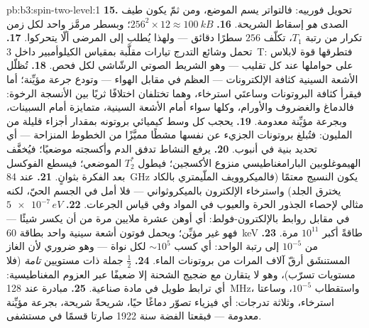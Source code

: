 \begin{solution}{pb:b3:spin-two-level:1}
\textbf{15.} تحويل فورييه: فالتواتر يسم الموضع، ومن ثمّ
يكون طيف الصدى \emph{هو} إسقاط الشريحة.
\textbf{16.} $256^2 \times 12 \approx \qty{100}{kB}$؛ وبسطر
مرمَّز واحد لكل زمن تكرار من رتبة $T_1$، تكلّف $256$ سطرًا
دقائق --- ولهذا يُطلب إلى المرضى ألّا يتحركوا.
\textbf{17.} تحمل وشائع التدرج تيارات مقلَّبة بمقياس الكيلوأمبير
داخل \qty{3}{T}: فتطرقها قوة لابلاس على حواملها عند كل
تقليب --- وهو الشريط الصوتي الرشّاشي لكل فحص.
\textbf{18.} تُظلّل الأشعة السينية كثافة الإلكترونات --- العظم في مقابل الهواء ---
وتودع جرعة مؤيِّنة؛ أما  فيقرأ كثافة البروتونات وساعتَي
استرخاء، وهما تختلفان اختلافًا ثريًا بين الأنسجة الرخوة: فالدماغ
والغضروف والأورام، وكلها سواء أمام الأشعة السينية، متمايزة أمام السبينات،
وبجرعة مؤيِّنة معدومة.
\textbf{19.} يحجب كل وسط كيميائي بروتونه بمقدار
أجزاء قليلة من المليون: فتُبلغ بروتونات الجزيء عن نفسها مشطًا مميَّزًا
من الخطوط المنزاحة --- أي تحديد بنية في أنبوب.
\textbf{20.} يرفع النشاط تدفق الدم وأكسجته موضعيًا؛ فيُخفَّف
الهيموغلوبين البارامغناطيسي منزوع الأكسجين؛ فيطول $T_2^*$ الموضعي؛
فيسطع الفوكسل بعد الفكرة بثوانٍ.
\textbf{21.} عند \qty{84}{GHz} يكون النسيج معتمًا (فالميكروويف
الملّيمتري بالكاد يخترق الجلد) واسترخاء الإلكترون
بالميكروثواني --- فلا أمل في الجسم الحيّ، لكنه مثالي لإحصاء
الجذور الحرة والعيوب في المواد وفي قياس الجرعات.
\textbf{22.} $\num{5e-7}\,\unit{eV}$ في مقابل روابط بالإلكترون-فولط: أي أوهن
عشرة ملايين مرة من أن يكسر شيئًا --- فهو غير مؤيِّن؛ ويحمل فوتون
أشعة سينية واحد بطاقة \qty{60}{keV} طاقةً أكبر $10^{11}$ مرة.
\textbf{23.} من $10^{-5}$ إلى رتبة الواحد: أي كسب $\sim10^5$ لكل
نواة --- وهو ضروري لأن الغاز المستنشَق أرقّ آلاف
المرات من بروتونات الماء.
\textbf{24.}  $\tfrac12$ جملة ذات مستويين \emph{تامة}
(فلا مستويات تسرّب)، وهو لا يتقارن مع ضجيج الشحنة إلا
ضعيفًا عبر العزوم المغناطيسية: أي ترابط طويل في مادة صناعية.
\textbf{25.} مبادرة عند \qty{128}{MHz}، واستقطاب $10^{-5}$،
وساعتا استرخاء، وثلاثة تدرجات: أي فيزياء 
تصوّر دماغًا حيًا، شريحةً شريحة، بجرعة مؤيِّنة معدومة ---
فبقعتا الفضة سنة 1922 صارتا قسمًا في مستشفى.
\end{solution}

